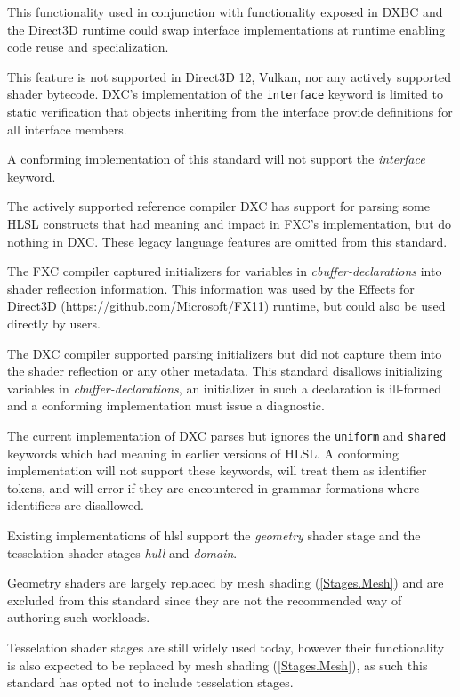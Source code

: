 \p This functionality used in conjunction with functionality exposed in DXBC and
the Direct3D runtime could swap interface implementations at runtime enabling
code reuse and specialization.

\p This feature is not supported in Direct3D 12, Vulkan, nor any actively
supported shader bytecode. DXC's implementation of the \texttt{interface}
keyword is limited to static verification that objects inheriting from the
interface provide definitions for all interface members.

\p A conforming implementation of this standard will not support the
\textit{interface} keyword.


\p The actively supported reference compiler DXC has support for parsing some
HLSL constructs that had meaning and impact in FXC's implementation, but do
nothing in DXC. These legacy language features are omitted from this standard.


\p The FXC compiler captured initializers for variables in
\textit{cbuffer-declarations} into shader reflection information. This
information was used by the Effects for Direct3D
(\url{https://github.com/Microsoft/FX11}) runtime, but could also be used
directly by users.

\p The DXC compiler supported parsing initializers but did not capture them into
the shader reflection or any other metadata. This standard disallows
initializing variables in \textit{cbuffer-declarations}, an initializer in such
a declaration is ill-formed and a conforming implementation must issue a
diagnostic.


\p The current implementation of DXC parses but ignores the \texttt{uniform} and
\texttt{shared} keywords which had meaning in earlier versions of HLSL. A
conforming implementation will not support these keywords, will treat them as
identifier tokens, and will error if they are encountered in grammar formations
where identifiers are disallowed.


\p Existing implementations of \acrshort{hlsl} support the \textit{geometry}
shader stage and the tesselation shader stages \textit{hull} and
\textit{domain}.

\p Geometry shaders are largely replaced by mesh shading (\ref{Stages.Mesh}) and
are excluded from this standard since they are not the recommended way of
authoring such workloads.

\p Tesselation shader stages are still widely used today, however their
functionality is also expected to be replaced by mesh shading
(\ref{Stages.Mesh}), as such this standard has opted not to include tesselation
stages.
